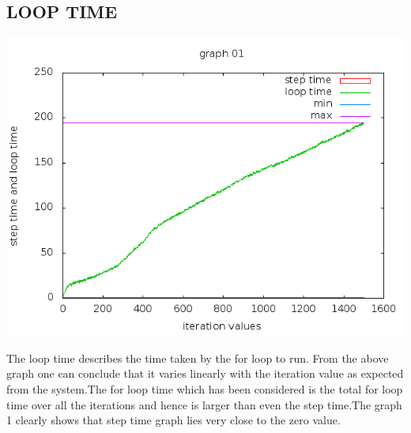 \documentclass[11pt]{article}
\begin{document}
\subsection{LOOP TIME}
\begin{center}
  \includegraphics[scale=.5]{g03_plot01.png}
\end{center}
The loop time describes the time taken by the for loop to run. From the above graph one can conclude that it varies linearly with the iteration value as expected from the system.The for loop time which has been considered is the total for loop time over all the iterations and hence is larger than even the step time.The graph 1 clearly shows that step time graph lies very close to the zero value.
\end{document}
